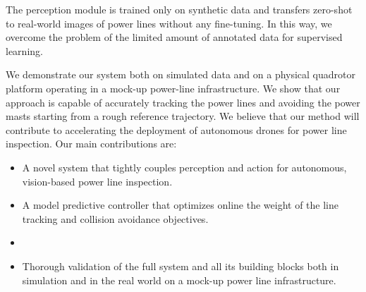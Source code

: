 The perception module is trained only on synthetic data and transfers zero-shot to real-world images of power lines without any fine-tuning. In this way, we overcome the problem of the limited amount of annotated data for supervised learning.

We demonstrate our system both on simulated data and on a physical quadrotor platform operating in a mock-up power-line infrastructure. We show that our approach is capable of accurately tracking the power lines and avoiding the power masts starting from a rough reference trajectory. We believe that our method will contribute to accelerating the deployment of autonomous drones for power line inspection.
Our main contributions are:
\begin{itemize}
    \item A novel system that tightly couples perception and action for autonomous, vision-based power line inspection.
    \item A model predictive controller that optimizes online the weight of the line tracking and collision avoidance objectives.
    \item {}
    \item Thorough validation of the full system and all its building blocks both in simulation and in the real world on a mock-up power line infrastructure.
\end{itemize}